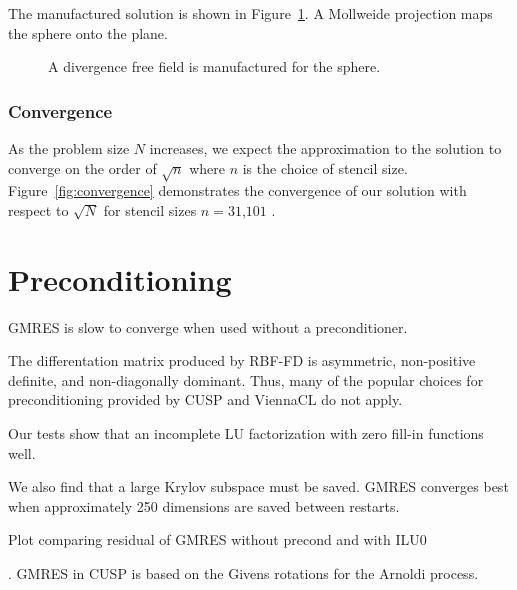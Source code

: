 The manufactured solution is shown in Figure~\ref{fig:manufactured_solution}. A Mollweide projection \cite{Mollweide_ref} maps the sphere onto the plane. 

\begin{figure} 
\centering
\caption{A divergence free field is manufactured for the sphere. }
\label{fig:manufactured_solution}
\end{figure} 

\subsubsection{Convergence}


As the problem size $N$ increases, we expect the approximation to the solution to converge on the order of $\sqrt{n}$ where $n$ is the choice of stencil size. Figure~\ref{fig:convergence} demonstrates the convergence of our solution with respect to $\sqrt{N}$ for stencil sizes $n=31$,$101$ . 




\section{Preconditioning} 

GMRES is slow to converge when used without a preconditioner. 

The differentation matrix produced by RBF-FD is asymmetric, non-positive definite, and non-diagonally dominant. Thus, many of the popular choices for preconditioning provided by CUSP and ViennaCL do not apply. 

Our tests show that an incomplete LU factorization with zero fill-in \cite{Saad2003} functions well. 

We also find that a large Krylov subspace must be saved. GMRES converges best when approximately 250 dimensions are saved between restarts. 

{\color{blue} Plot comparing residual of GMRES without precond and with ILU0 }

.
GMRES in CUSP is based on the Givens rotations for the Arnoldi process. 

